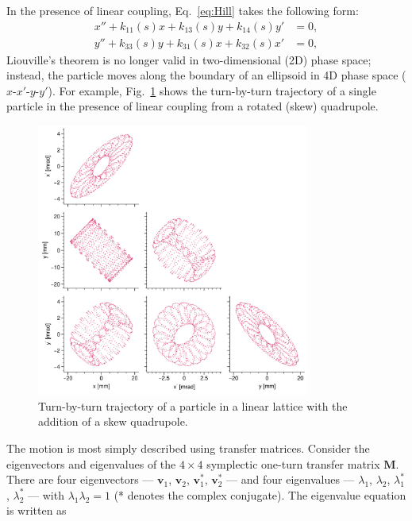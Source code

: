 In the presence of linear coupling, Eq.~\eqref{eq:Hill} takes the following form:
%
\begin{equation}\label{eq:single_particle_eom_coupled}
\begin{aligned}
    x'' + k_{11}(s)x + k_{13}(s)y + k_{14}(s)y' &= 0, \\
    y'' + k_{33}(s)y + k_{31}(s)x + k_{32}(s)x' &= 0,
\end{aligned}
\end{equation}
%
Liouville's theorem is no longer valid in two-dimensional (2D) phase space; instead, the particle moves along the boundary of an ellipsoid in 4D phase space ($x$-$x'$-$y$-$y'$). For example, Fig.~\ref{fig:skew_quad_single_particle_tbt} shows the turn-by-turn trajectory of a single particle in the presence of linear coupling from a rotated (skew) quadrupole.
%
\begin{figure}[!p]
    \centering
    \includegraphics[width=0.8\textwidth]{Images/chapter1/skew_quad_single_particle_tbt.png}
    \caption{Turn-by-turn trajectory of a particle in a linear lattice with the addition of a skew quadrupole.}
    \label{fig:skew_quad_single_particle_tbt}
\end{figure}
%
The motion is most simply described using transfer matrices. Consider the eigenvectors and eigenvalues of the $4 \times 4$ symplectic one-turn transfer matrix $\mathbf{M}$. There are four eigenvectors — $\mathbf{v}_1$, $\mathbf{v}_2$, $\mathbf{v}_1^*$, $\mathbf{v}_2^*$ — and four eigenvalues — $\lambda_1$, $\lambda_2$, $\lambda_1^*$, $\lambda_2^*$ — with $\lambda_1\lambda_2 = 1$ (* denotes the complex conjugate). The eigenvalue equation is written as
